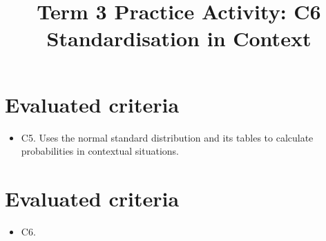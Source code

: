 \makeatletter
{}
\makeatother



\title{Term 3 Practice Activity: C6 Standardisation in Context}
\author{}
\date{}


	\maketitle
	
	\setcounter{tocdepth}{1}
	\setcounter{secnumdepth}{2}
	\tableofcontents
	
	\section*{Evaluated criteria}
	\begin{itemize}
		\item C5. Uses the normal standard distribution and its tables to calculate probabilities in contextual situations.
	\end{itemize}

\maketitle
\tableofcontents
\section*{Evaluated criteria}\begin{itemize}\item C6.\end{itemize}

